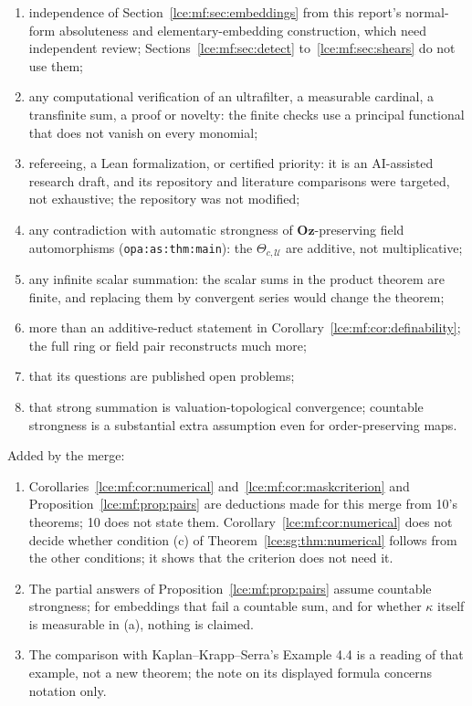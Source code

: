 \documentclass[11pt,letterpaper]{article}
\numberwithin{equation}{section}
\theoremstyle{definition}
\theoremstyle{remark}
\newcommand{\Oz}{\mathbf{Oz}}
\newcommand{\thref}[1]{Theorem~\ref{#1}}
\newcommand{\prref}[1]{Proposition~\ref{#1}}
\newcommand{\lbl}[1]{\nolinkurl{#1}}%
\begin{document}
\begin{enumerate}[label=10.\arabic*]
equivalences and conditional constructions;
\item independence of Section~\ref{lce:mf:sec:embeddings} from this
report's normal-form absoluteness and elementary-embedding construction,
which need independent review; Sections~\ref{lce:mf:sec:detect}
to~\ref{lce:mf:sec:shears} do not use them;
\item any computational verification of an ultrafilter, a measurable
cardinal, a transfinite sum, a proof or novelty: the finite checks use a
principal functional that does not vanish on every monomial;
\item refereeing, a Lean formalization, or certified priority: it is an
AI-assisted research draft, and its repository and literature comparisons
were targeted, not exhaustive; the repository was not modified;
\item any contradiction with automatic strongness of $\Oz$-preserving field
automorphisms (\lbl{opa:as:thm:main}): the $\Theta_{c,\mathcal U}$ are
additive, not multiplicative;
\item any infinite scalar summation: the scalar sums in the product theorem
are finite, and replacing them by convergent series would change the
theorem;
\item more than an additive-reduct statement in
Corollary~\ref{lce:mf:cor:definability}; the full ring or field pair
reconstructs much more;
\item that its questions are published open problems;
\item that strong summation is valuation-topological convergence;
countable strongness is a substantial extra assumption even for
order-preserving maps.
\end{enumerate}
Added by the merge:
\begin{enumerate}[label=M10.\arabic*]
\item Corollaries~\ref{lce:mf:cor:numerical} and~\ref{lce:mf:cor:maskcriterion}
and \prref{lce:mf:prop:pairs} are deductions made for this merge from 10's
theorems; 10 does not state them. Corollary~\ref{lce:mf:cor:numerical} does
not decide whether condition (c) of \thref{lce:sg:thm:numerical} follows
from the other conditions; it shows that the criterion does not need it.
\item The partial answers of \prref{lce:mf:prop:pairs} assume countable
strongness; for embeddings that fail a countable sum, and for whether
$\kappa$ itself is measurable in (a), nothing is claimed.
\item The comparison with Kaplan--Krapp--Serra's Example 4.4 is a reading of
that example, not a new theorem; the note on its displayed formula concerns
notation only.
\end{enumerate}
\end{document}
